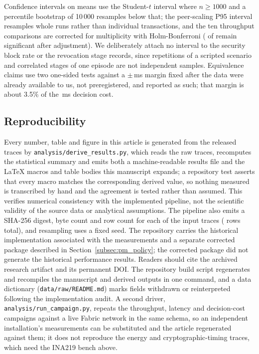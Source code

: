 \documentclass[a4paper,fleqn]{cas-sc}
\begin{document}
Confidence intervals on means use the Student-$t$ interval where
$n \ge 1000$ and a percentile bootstrap of 10\,000 resamples below that;
the peer-scaling P95 interval resamples whole runs rather than individual
transactions, and the ten throughput comparisons are corrected for
multiplicity with Holm-Bonferroni (\OverheadHolmSig{} of \OverheadLevels{}
remain significant after adjustment). We deliberately attach no interval
to the security block rate or the revocation stage records, since
repetitions of a scripted scenario and correlated stages of one episode
are not independent samples. Equivalence claims use two one-sided tests
against a $\pm$\DecisionMargin\,ms margin fixed after the data were
already available to us, not preregistered, and reported as such; that
margin is about 3.5\% of the \DecisionMean\,ms decision cost.

\subsection{Reproducibility}
\label{subsec:repro}

Every number, table and figure in this article is generated from the
released traces by \texttt{analysis/derive\_results.py}, which reads the
raw traces, recomputes the statistical summary and emits both a
machine-readable results file and the LaTeX macros and table bodies this
manuscript expands; a repository test asserts that every macro matches the
corresponding derived value, so nothing measured is transcribed by hand
and the agreement is tested rather than assumed. This verifies numerical consistency with the implemented pipeline, not the scientific validity of the source data or analytical assumptions. The pipeline also emits
a SHA-256 digest, byte count and row count for each of the \TraceCount{}
input traces (\TraceRows{} rows total), and resampling uses a fixed seed.
The repository carries the historical implementation associated with the
measurements and a separate corrected package described in
Section~\ref{subsec:pm_policy}; the corrected package did not generate the
historical performance results. Readers should cite the archived research artifact and its permanent DOI. The repository build script regenerates and recompiles the manuscript and derived outputs in one command, and a data dictionary (\texttt{data/raw/README.md}) marks fields
withdrawn or reinterpreted following the implementation audit. A second driver,
\texttt{analysis/run\_campaign.py}, repeats the throughput, latency and
decision-cost campaigns against a live Fabric network in the same schema,
so an independent installation's measurements can be substituted and the
article regenerated against them; it does not reproduce the energy and
cryptographic-timing traces, which need the INA219 bench above.
\end{document}
